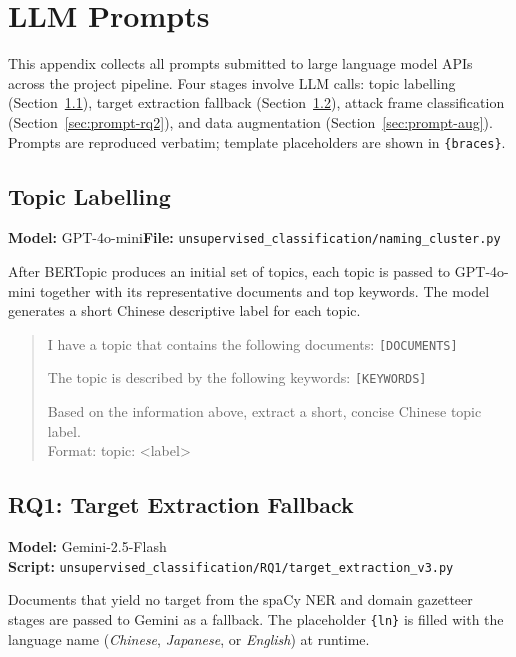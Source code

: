\documentclass[../CLthesis.tex]{subfiles}
\begin{document}
\chapter{LLM Prompts}%
\label{appendix:prompts}

This appendix collects all prompts submitted to large language model APIs across the project pipeline. Four stages involve LLM calls: topic labelling (Section~\ref{sec:prompt-topic}), target extraction fallback (Section~\ref{sec:prompt-ner}), attack frame classification (Section~\ref{sec:prompt-rq2}), and data augmentation (Section~\ref{sec:prompt-aug}). Prompts are reproduced verbatim; template placeholders are shown in \texttt{\{braces\}}.

\section{Topic Labelling}
\label{sec:prompt-topic}

\noindent\textbf{Model:} GPT-4o-mini\quad\textbf{File:} \texttt{unsupervised\_classification/naming\_cluster.py}

\smallskip\noindent
After BERTopic produces an initial set of topics, each topic is passed to GPT-4o-mini together with its representative documents and top keywords. The model generates a short Chinese descriptive label for each topic.

\begin{quote}
\small
I have a topic that contains the following documents:
\texttt{[DOCUMENTS]}

The topic is described by the following keywords: \texttt{[KEYWORDS]}

Based on the information above, extract a short, concise Chinese topic label.\\
Format: topic: \textless{}label\textgreater{}
\end{quote}

\section{RQ1: Target Extraction Fallback}
\label{sec:prompt-ner}

\noindent\textbf{Model:} Gemini-2.5-Flash \\
\textbf{Script:} \texttt{unsupervised\_classification/RQ1/target\_extraction\_v3.py}

\smallskip\noindent
Documents that yield no target from the spaCy NER and domain gazetteer stages are passed to Gemini as a fallback. The placeholder \texttt{\{ln\}} is filled with the language name (\textit{Chinese}, \textit{Japanese}, or \textit{English}) at runtime.
\end{document}
